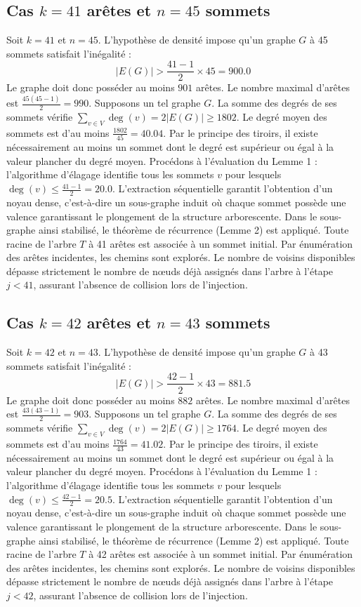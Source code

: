 \documentclass[12pt,a4paper]{article}
\begin{document}
\subsection{Cas $k = 41$ arêtes et $n = 45$ sommets}
Soit $k = 41$ et $n = 45$. L'hypothèse de densité impose qu'un graphe $G$ à 45 sommets satisfait l'inégalité :
$$ |E(G)| > \frac{41-1}{2} \times 45 = 900.0 $$
Le graphe doit donc posséder au moins $901$ arêtes. Le nombre maximal d'arêtes est $\frac{45(45-1)}{2} = 990$.
Supposons un tel graphe $G$. La somme des degrés de ses sommets vérifie $\sum_{v \in V} \deg(v) = 2|E(G)| \geq 1802$.
Le degré moyen des sommets est d'au moins $\frac{1802}{45} = 40.04$.
Par le principe des tiroirs, il existe nécessairement au moins un sommet dont le degré est supérieur ou égal à la valeur plancher du degré moyen.
Procédons à l'évaluation du Lemme 1 : l'algorithme d'élagage identifie tous les sommets $v$ pour lesquels $\deg(v) \leq \frac{41-1}{2} = 20.0$.
L'extraction séquentielle garantit l'obtention d'un noyau dense, c'est-à-dire un sous-graphe induit où chaque sommet possède une valence garantissant le plongement de la structure arborescente.
Dans le sous-graphe ainsi stabilisé, le théorème de récurrence (Lemme 2) est appliqué. Toute racine de l'arbre $T$ à 41 arêtes est associée à un sommet initial. Par énumération des arêtes incidentes, les chemins sont explorés. Le nombre de voisins disponibles dépasse strictement le nombre de nœuds déjà assignés dans l'arbre à l'étape $j < 41$, assurant l'absence de collision lors de l'injection.

\subsection{Cas $k = 42$ arêtes et $n = 43$ sommets}
Soit $k = 42$ et $n = 43$. L'hypothèse de densité impose qu'un graphe $G$ à 43 sommets satisfait l'inégalité :
$$ |E(G)| > \frac{42-1}{2} \times 43 = 881.5 $$
Le graphe doit donc posséder au moins $882$ arêtes. Le nombre maximal d'arêtes est $\frac{43(43-1)}{2} = 903$.
Supposons un tel graphe $G$. La somme des degrés de ses sommets vérifie $\sum_{v \in V} \deg(v) = 2|E(G)| \geq 1764$.
Le degré moyen des sommets est d'au moins $\frac{1764}{43} = 41.02$.
Par le principe des tiroirs, il existe nécessairement au moins un sommet dont le degré est supérieur ou égal à la valeur plancher du degré moyen.
Procédons à l'évaluation du Lemme 1 : l'algorithme d'élagage identifie tous les sommets $v$ pour lesquels $\deg(v) \leq \frac{42-1}{2} = 20.5$.
L'extraction séquentielle garantit l'obtention d'un noyau dense, c'est-à-dire un sous-graphe induit où chaque sommet possède une valence garantissant le plongement de la structure arborescente.
Dans le sous-graphe ainsi stabilisé, le théorème de récurrence (Lemme 2) est appliqué. Toute racine de l'arbre $T$ à 42 arêtes est associée à un sommet initial. Par énumération des arêtes incidentes, les chemins sont explorés. Le nombre de voisins disponibles dépasse strictement le nombre de nœuds déjà assignés dans l'arbre à l'étape $j < 42$, assurant l'absence de collision lors de l'injection.
\end{document}
